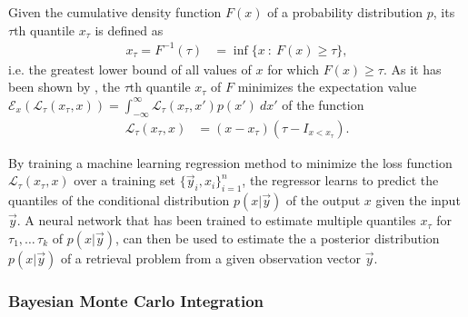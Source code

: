 \documentclass[journal abbreviation, manuscript]{copernicus}
\begin{document}
    Given the cumulative density function $F(x)$ of a probability distribution
    $p$, its $\tau\text{th}$ quantile $x_\tau$ is defined as
    \begin{align}
    x_\tau = F^{-1}(\tau) &= \inf \{x \: : \: F(x) \geq \tau \},
    \end{align}
    i.e. the greatest lower bound of all values of $x$ for which $F(x) \geq \tau$.
    As it has been shown by \citep{koenker}, the $\tau\text{th}$ quantile $x_\tau$ of $F$
    minimizes the expectation value $\mathcal{E}_x\left ( \mathcal{L}_\tau(x_\tau, x) \right) = \int_{-\infty}^\infty \mathcal{L}_\tau(x_\tau, x') p(x') \: dx'$
    of the function
    \begin{align}\label{eq:quantile_loss}
      \mathcal{L}_{\tau}(x_\tau, x) &=  (x - x_\tau)(\tau - I_{x < x_\tau}).
    \end{align}

    By training a machine learning regression method to minimize the
    loss function $\mathcal{L}_\tau(x_\tau, x)$ over a training set
    $\{\vec{y}_i, x_i\}_{i = 1}^n$, the regressor learns to predict
    the quantiles of the conditional distribution $p(x | \vec{y})$
    of the output $x$ given the input $\vec{y}$. A neural network that
    has been trained  to estimate multiple quantiles $x_\tau$
    for $\tau_1 ,\ldots\, \tau_k$ of $p(x| \vec{y})$, can then be used to
    estimate the a posterior distribution $p(x | \vec{y})$ of a retrieval
    problem from a given observation vector $\vec{y}$.
    
    

\subsubsection{Bayesian Monte Carlo Integration}
\end{document}
